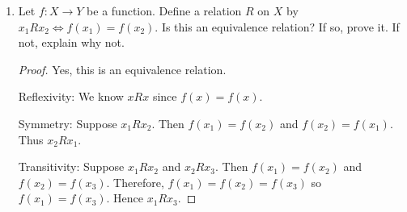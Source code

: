 \documentclass[12pt]{article}
\begin{document}
\begin{enumerate}
\begin{enumerate}
\begin{proof}
Case 3: $X$ is uncountably infinite. Therefore, $\mathcal{P}(X)$ is uncountably infinite because it's size is greater than $X$, and uncountably infinite set because $|\mathcal{P}(X)| > |X|$. 

Therefore, we conclude that $\mathcal{P}(X)$ can be either finite or uncountably infinite. 
\end{proof}
\end{enumerate}

\item Let $f:X\to Y$ be a function. Define a relation $R$ on $X$ by $x_1 R x_2 \Leftrightarrow f(x_1)=f(x_2)$. Is this an equivalence relation? If so, prove it. If not, explain why not.

\begin{proof}
Yes, this is an equivalence relation. 

Reflexivity: We know $xRx$ since $f(x) = f(x)$. 

Symmetry: Suppose $x_1 R x_2$. Then $f(x_1) = f(x_2)$ and $f(x_2) = f(x_1)$. Thus $x_2 R x_1$.

Transitivity: Suppose $x_1 R x_2$ and $x_2 R x_3$. Then $f(x_1) = f(x_2)$ and $f(x_2) = f(x_3)$. Therefore, $f(x_1) = f(x_2) = f(x_3)$ so $f(x_1) = f(x_3)$. Hence $x_1 R x_3$. 
\end{proof}

\end{enumerate}
\end{document}

